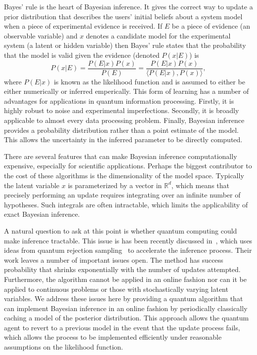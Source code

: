 \documentclass[aps,amsmath,onecolumn,amssymb]{revtex4}
\begin{document}
Bayes' rule is the heart of Bayesian inference.  It gives the correct way to update a prior distribution that describes the users' initial beliefs about a system model when a piece of experimental evidence is received.  If $E$ be a piece of evidence (an observable variable) and $x$ denotes a candidate model for the experimental system (a latent or hidden variable) then Bayes' rule states that the probability that the model is valid given the evidence (denoted $P(x|E)$) is 
\begin{equation}
P(x|E)= \frac{P(E|x) P(x)}{P(E)}= \frac{P(E|x) P(x)}{\langle P(E|x), P(x) \rangle},\label{eq:Bayes}
\end{equation}
where $P(E|x)$ is known as the likelihood function and is assumed to either be either numerically or inferred emperically.
This form of learning has a number of advantages for applications in quantum information processing.  Firstly, it is highly robust to noise and experimental imperfections.  Secondly, it is broadly applicable to almost every data processing problem.  Finally, Bayesian inference provides a probability distribution rather than a point estimate of the model. This allows the uncertainty in the inferred parameter to be directly computed.



There are several features that can make Bayesian inference computationally expensive, especially for scientific applications.  Perhaps the biggest contributor to the cost of these algorithms is the dimensionality of the model space.  Typically the latent variable $x$ is parameterized by a vector in $\mathbb{R}^d$, which means that precisely performing an update requires integrating over an infinite number of hypotheses.  Such integrals are often intractable, which limits the applicability of exact Bayesian inference.  %

A natural question to ask at this point is whether quantum computing could make inference tractable.  This issue is has been recently discussed in~\cite{LYC14}, which uses ideas from quantum rejection sampling~\cite{HHL09,ORR13} to accelerate the inference process.  Their work leaves a number of important issues open.  The method has success probability that shrinks exponentially with the number of updates attempted.  Furthermore, the algorithm cannot be applied in an online fashion nor can it be applied to continuous problems or those with stochastically varying latent variables.  We address these issues here by providing a quantum algorithm that can implement Bayesian inference in an online fashion by periodically classically caching a model of the posterior distribution.  This approach allows the quantum agent to revert to a previous model in the event that the update process fails, which allows the process to be implemented efficiently under reasonable assumptions on the likelihood function.
\end{document}

